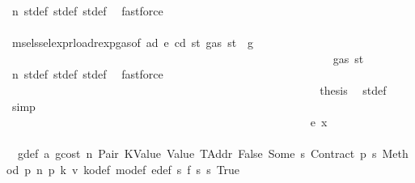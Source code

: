 \begin{isabellebody}
\ n{}\ st{\isacharprime}{\kern0pt}{\isacharunderscore}{\kern0pt}def\ st{\isacharprime}{\kern0pt}{\isacharprime}{\kern0pt}{\isacharunderscore}{\kern0pt}def\ st{\isacharprime}{\kern0pt}{\isacharprime}{\kern0pt}{\isacharprime}{\kern0pt}{\isacharunderscore}{\kern0pt}def\ \isamarkupfalse%
\ fastforce\isanewline
\ \ \ \ \ \ \ \ \ \ \ \ \ \ \ \ \ \ \ \ \ \ \ \ \ \ \ \ \ \ \ \ \ \ \ \ \ \ \ \ \ \ \ \ \ \ \ \ \ \ \ \ \isamarkupfalse%
\ \isamarkupfalse%
\ msel{\isacharunderscore}{\kern0pt}ssel{\isacharunderscore}{\kern0pt}expr{\isacharunderscore}{\kern0pt}load{\isacharunderscore}{\kern0pt}rexp{\isacharunderscore}{\kern0pt}gas{\isacharparenleft}{\kern0pt}{}{\isacharparenright}{\kern0pt}{\isacharbrackleft}{\kern0pt}of\ ad\ e\ cd\ st{\isacharprime}{\kern0pt}\ {\isachardoublequoteopen}gas\ st\ {\isacharminus}{\kern0pt}\ g{\isachardoublequoteclose}{\isacharbrackright}{\kern0pt}\isanewline
\ \ \ \ \ \ \ \ \ \ \ \ \ \ \ \ \ \ \ \ \ \ \ \ \ \ \ \ \ \ \ \ \ \ \ \ \ \ \ \ \ \ \ \ \ \ \ \ \ \ \ \ \ \ \isamarkupfalse%
\ {\isachardoublequoteopen}{\isasymdots}\ {\isasymle}\ gas\ st{\isacharprime}{\kern0pt}{\isachardoublequoteclose}\ \isamarkupfalse%
\ n\ st{\isacharprime}{\kern0pt}{\isacharunderscore}{\kern0pt}def\ st{\isacharprime}{\kern0pt}{\isacharprime}{\kern0pt}{\isacharunderscore}{\kern0pt}def\ st{\isacharprime}{\kern0pt}{\isacharprime}{\kern0pt}{\isacharprime}{\kern0pt}{\isacharunderscore}{\kern0pt}def\ \isamarkupfalse%
\ fastforce\isanewline
\ \ \ \ \ \ \ \ \ \ \ \ \ \ \ \ \ \ \ \ \ \ \ \ \ \ \ \ \ \ \ \ \ \ \ \ \ \ \ \ \ \ \ \ \ \ \ \ \ \ \ \ \isamarkupfalse%
\ \isamarkupfalse%
\ {\isacharquery}{\kern0pt}thesis\ \isamarkupfalse%
\ st{\isacharprime}{\kern0pt}{\isacharunderscore}{\kern0pt}def\ \isamarkupfalse%
\ simp\isanewline
\ \ \ \ \ \ \ \ \ \ \ \ \ \ \ \ \ \ \ \ \ \ \ \ \ \ \ \ \ \ \ \ \ \ \ \ \ \ \ \ \ \ \ \ \ \ \ \ \ \ \isamarkupfalse%
\isanewline
\ \ \ \ \ \ \ \ \ \ \ \ \ \ \ \ \ \ \ \ \ \ \ \ \ \ \ \ \ \ \ \ \ \ \ \ \ \ \ \ \ \ \ \ \ \ \ \ \ \ \ \ \isamarkupfalse%
\ {\isacharparenleft}{\kern0pt}e\ x{\isacharparenright}{\kern0pt}\isanewline
\ \ \ \ \ \ \ \ \ \ \ \ \ \ \ \ \ \ \ \ \ \ \ \ \ \ \ \ \ \ \ \ \ \ \ \ \ \ \ \ \ \ \ \ \ \ \ \ \ \ \ \ \isamarkupfalse%
\ {}{\isacharparenleft}{\kern0pt}{}{\isacharparenright}{\kern0pt}\ g{\isacharunderscore}{\kern0pt}def\ a{}\ gcost\ n\ Pair\ KValue\ Value\ TAddr\ False\ Some\ s{}\ Contract\ p{}\ s{}\ Method\ p{}\ n{}\ p{}\ k{}\ v\ k\isactrlsub o{\isacharunderscore}{\kern0pt}def\ m\isactrlsub o{\isacharunderscore}{\kern0pt}def\ e{\isacharprime}{\kern0pt}{\isacharunderscore}{\kern0pt}def\ s{}\ f{}\ s{}\ s{}\ True\ \isamarkupfalse%

\end{isabellebody}
